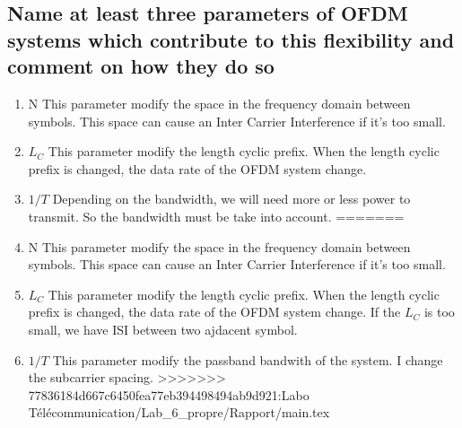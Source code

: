 \documentclass[frenchb, oneside, headings=normal]{scrartcl}
\begin{document}
\subsection{Name at least three parameters of OFDM systems which contribute to this flexibility and comment on how they do so}
\begin{enumerate}
<<<<<<< HEAD:LaboTélécommunication/Lab_6_propre/Rapport/main.tex
\item N This parameter modify the space in the frequency domain between symbols.   This space can cause an Inter Carrier Interference if it's too small.
\item $L_C$ This parameter modify the length cyclic prefix. When the length cyclic prefix is changed, the data rate of the OFDM system change. 
\item $1/T$ Depending on the bandwidth, we will need more or less power to transmit. So the bandwidth must be take into account. 
=======
\item N This parameter modify the space in the frequency domain between symbols. This space can cause an Inter Carrier Interference if it's too small.
\item $L_C$ This parameter modify the length cyclic prefix. When the length cyclic prefix is changed, the data rate of the OFDM system change. If the $L_C$ is too small, we have ISI between two ajdacent symbol.
\item $1/T$ This parameter modify the passband bandwith of the system. I change the subcarrier spacing.
>>>>>>> 77836184d667c6450fea77eb394498494ab9d921:Labo Télécommunication/Lab_6_propre/Rapport/main.tex
\end{enumerate}
\end{document}

